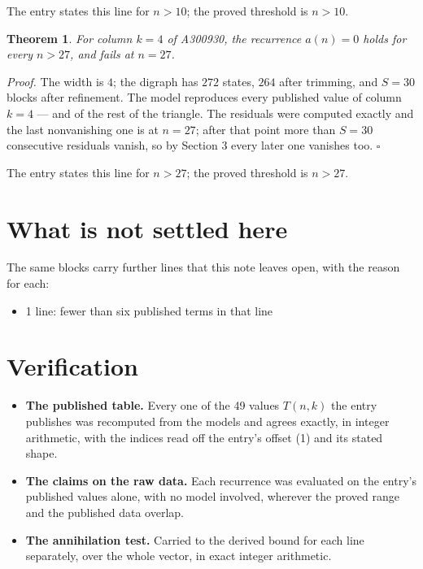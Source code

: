 \documentclass[11pt]{article}
\newtheorem{theorem}{Theorem}
\theoremstyle{definition}
\begin{document}
The entry states this line for $n > 10$; the proved threshold is $n > 10$.

\begin{theorem} For column $k = 4$ of A300930, the recurrence $a(n) = 0$ holds for every $n > 27$, and fails at $n = 27$.\end{theorem}

{\itshape Proof.} The width is $4$; the digraph has $272$ states, $264$ after trimming, and $S = 30$ blocks after refinement. The model reproduces every published value of column $k = 4$ --- and of the rest of the triangle. The residuals were computed exactly and the last nonvanishing one is at $n = 27$; after that point more than $S = 30$ consecutive residuals vanish, so by Section 3 every later one vanishes too. $\square$

The entry states this line for $n > 27$; the proved threshold is $n > 27$.

\section{What is not settled here}

The same blocks carry further lines that this note leaves open, with the reason for each:

\begin{itemize}

\item 1 line: fewer than six published terms in that line

\end{itemize}

\section{Verification}

\begin{itemize}

\item {\bfseries The published table.} Every one of the 49 values $T(n,k)$ the entry publishes was recomputed from the models and agrees exactly, in integer arithmetic, with the indices read off the entry's offset (1) and its stated shape.

\item {\bfseries The claims on the raw data.} Each recurrence was evaluated on the entry's published values alone, with no model involved, wherever the proved range and the published data overlap.

\item {\bfseries The annihilation test.} Carried to the derived bound for each line separately, over the whole vector, in exact integer arithmetic.

\end{itemize}
\end{document}
